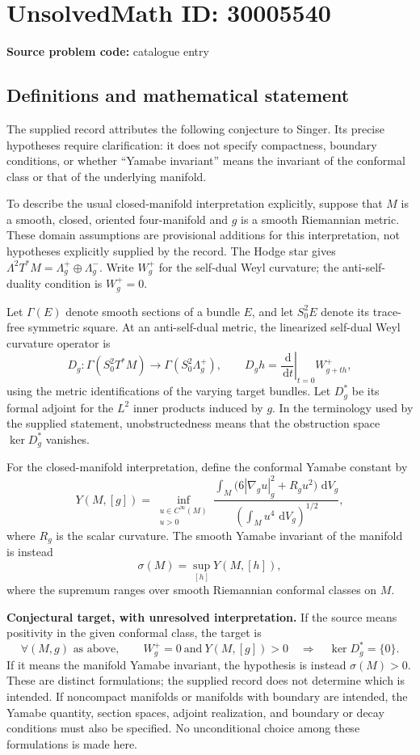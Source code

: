 \documentclass[11pt]{article}
\newcommand{\dd}{\,\mathrm{d}}
\begin{document}
\section*{UnsolvedMath ID: 30005540}
\textbf{Source problem code:} catalogue entry
\subsection{Definitions and mathematical statement}
The supplied record attributes the following conjecture to Singer. Its precise hypotheses require clarification: it does not specify compactness, boundary conditions, or whether ``Yamabe invariant'' means the invariant of the conformal class or that of the underlying manifold.

To describe the usual closed-manifold interpretation explicitly, suppose that \(M\) is a smooth, closed, oriented four-manifold and \(g\) is a smooth Riemannian metric. These domain assumptions are provisional additions for this interpretation, not hypotheses explicitly supplied by the record. The Hodge star gives \(\Lambda^2T^*M=\Lambda_g^+\oplus\Lambda_g^-\). Write \(W_g^+\) for the self-dual Weyl curvature; the anti-self-duality condition is \(W_g^+=0\).

Let \(\Gamma(E)\) denote smooth sections of a bundle \(E\), and let \(S_0^2E\) denote its trace-free symmetric square. At an anti-self-dual metric, the linearized self-dual Weyl curvature operator is
\[
D_g:\Gamma(S_0^2T^*M)\longrightarrow\Gamma(S_0^2\Lambda_g^+),\qquad D_gh=\left.\frac{\dd}{\dd t}\right|_{t=0}W_{g+th}^+,
\]
using the metric identifications of the varying target bundles. Let \(D_g^*\) be its formal adjoint for the \(L^2\) inner products induced by \(g\). In the terminology used by the supplied statement, unobstructedness means that the obstruction space \(\ker D_g^*\) vanishes.

For the closed-manifold interpretation, define the conformal Yamabe constant by
\[
Y(M,[g])=\inf_{\substack{u\in C^\infty(M)\\u>0}}
\frac{\displaystyle\int_M\bigl(6|\nabla_gu|_g^2+R_gu^2\bigr)\,\dd V_g}
{\displaystyle\left(\int_Mu^4\,\dd V_g\right)^{1/2}},
\]
where \(R_g\) is the scalar curvature. The smooth Yamabe invariant of the manifold is instead
\[
\sigma(M)=\sup_{[h]}Y(M,[h]),
\]
where the supremum ranges over smooth Riemannian conformal classes on \(M\).

\textbf{Conjectural target, with unresolved interpretation.} If the source means positivity in the given conformal class, the target is
\[
\forall (M,g)\text{ as above},\qquad
W_g^+=0\ \text{and}\ Y(M,[g])>0
\quad\Longrightarrow\quad \ker D_g^*=\{0\}.
\]
If it means the manifold Yamabe invariant, the hypothesis is instead \(\sigma(M)>0\). These are distinct formulations; the supplied record does not determine which is intended. If noncompact manifolds or manifolds with boundary are intended, the Yamabe quantity, section spaces, adjoint realization, and boundary or decay conditions must also be specified. No unconditional choice among these formulations is made here.
\end{document}
